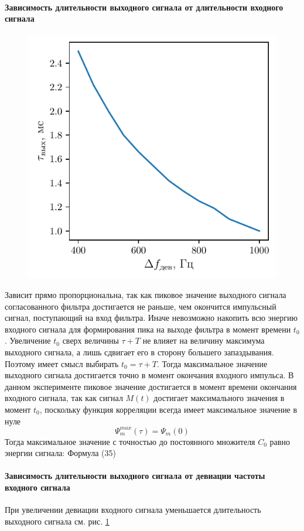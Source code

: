 \paragraph{Зависимость длительности выходного сигнала от длительности входного сигнала}%
\begin{figure}[H]
    \centering
    \includegraphics[width=0.6\linewidth]{imgs/task3/t3f0}
    \caption{}
    \label{fig:3.1}
\end{figure}
Зависит прямо пропорциональна, так как пиковое значение выходного сигнала
согласованного фильтра достигается не раньше, чем окончится импульсный сигнал,
поступающий на вход фильтра. Иначе невозможно накопить всю энергию входного
сигнала для формирования пика на выходе фильтра в момент времени $t_0$.
Увеличение $t_0$ сверх величины $\tau + T$ не влияет на величину максимума
выходного сигнала, а лишь сдвигает его в сторону большего запаздывания. Поэтому
имеет смысл выбирать $t_0 = \tau + T$. Тогда максимальное значение выходного
сигнала достигается точно в момент окончания входного импульса. В данном
эксперименте пиковое значение достигается в момент времени окончания входного
сигнала, так как сигнал $M(t)$ достигает максимального значения в момент $t_0$,
поскольку функция корреляции всегда имеет максимальное значение в нуле 
\begin{equation}
    \Psi^{max}_m(\tau) = \Psi_m(0)
\end{equation}
Тогда максимальное значение с точностью до постоянного множителя $C_0$
равно энергии сигнала: Формула (35)

\paragraph{Зависимость длительности выходного сигнала от девиации частоты входного сигнала}%
При увеличении девиации входного сигнала уменьшается длительность выходного
сигнала см. рис. \ref{fig:3.1}

